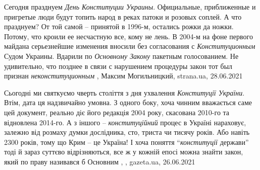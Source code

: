 Сегодня празднуем \emph{День Конституции Украины}. Официальные, приближенные и
пригретые люди будут топить народ в реках патоки и розовых соплей. А что
празднуем? От той самой – принятой в 1996-м, остались рожки да ножки. Потому,
что кроили ее несчастную все, кому не лень.  В 2004-м на фоне первого майдана
серьезнейшие изменения вносили без согласования с \emph{Конституционным} Судом
Украины. Вдарили по \emph{Основному Закону} пакетным голосованием. Не удивительно, что
позднее в связи с нарушением процедуры закон тот был признан \emph{неконституционным}
, 
Максим Могильницкий, strana.ua, 28.06.2021

Сьогодні ми святкуємо чверть століття з дня ухвалення \emph{Конституції України}.
Втім, дата ця надзвичайно умовна. З одного боку, хоча чинним вважається саме
цей документ, реально діє його редакція 2004 року, скасована 2010-го та
відновлена 2014-го. А з іншого – \emph{конституційний} процес в Україні нараховує,
залежно від розмаху думки дослідника, сто, триста чи тисячу років. Або навіть
2300 років, тому що Крим – це Україна! І хоча поняття \enquote{\emph{конституції} держави}
тоді й зараз суттєво відрізняються, все ж у кожній епосі можна знайти закон,
який по праву називався б Основним
, 
, gazeta.ua, 26.06.2021

